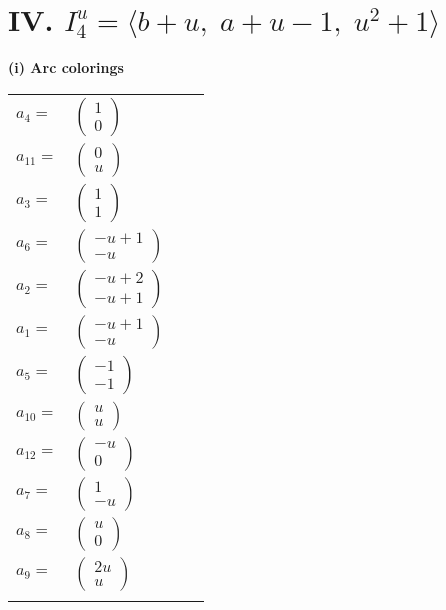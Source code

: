 \documentclass[1p]{elsarticle_modified}
\theoremstyle{definition}
\begin{document}
\centering \section*{IV. $I^u_{4}= \langle b+u,\;a+u-1,\;u^2+1 \rangle$}
\flushleft \textbf{(i) Arc colorings}\\
\begin{tabular}{m{7pt} m{180pt} m{7pt} m{180pt} }
\flushright $a_{4}=$&$\begin{pmatrix}1\\0\end{pmatrix}$ \\
\flushright $a_{11}=$&$\begin{pmatrix}0\\u\end{pmatrix}$ \\
\flushright $a_{3}=$&$\begin{pmatrix}1\\1\end{pmatrix}$ \\
\flushright $a_{6}=$&$\begin{pmatrix}- u+1\\- u\end{pmatrix}$ \\
\flushright $a_{2}=$&$\begin{pmatrix}- u+2\\- u+1\end{pmatrix}$ \\
\flushright $a_{1}=$&$\begin{pmatrix}- u+1\\- u\end{pmatrix}$ \\
\flushright $a_{5}=$&$\begin{pmatrix}-1\\-1\end{pmatrix}$ \\
\flushright $a_{10}=$&$\begin{pmatrix}u\\u\end{pmatrix}$ \\
\flushright $a_{12}=$&$\begin{pmatrix}- u\\0\end{pmatrix}$ \\
\flushright $a_{7}=$&$\begin{pmatrix}1\\- u\end{pmatrix}$ \\
\flushright $a_{8}=$&$\begin{pmatrix}u\\0\end{pmatrix}$ \\
\flushright $a_{9}=$&$\begin{pmatrix}2 u\\u\end{pmatrix}$\\&\end{tabular}
\end{document}
